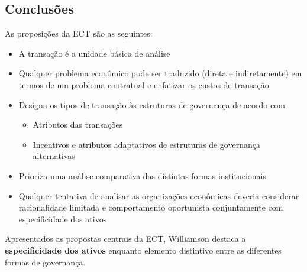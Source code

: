 \subsection*{Conclusões}

As proposições da ECT são as seguintes:
\begin{itemize}
	\item A transação é a unidade básica de análise
	\item Qualquer problema econômico pode ser traduzido (direta e indiretamente) em termos de um problema contratual e enfatizar os custos de transação
	\item Designa os tipos de transação às estruturas de governança de acordo com
	\begin{itemize}
		\item Atributos das transações
		\item Incentivos e atributos adaptativos de estruturas de governança alternativas
	\end{itemize}
	\item Prioriza uma análise comparativa das distintas formas institucionais
	\item Qualquer tentativa de analisar as organizações econômicas deveria considerar racionalidade limitada e comportamento oportunista conjuntamente com especificidade dos ativos
\end{itemize}
Apresentados as propostas centrais da ECT, Williamson destaca a \textbf{especificidade dos ativos} enquanto elemento distintivo entre as diferentes formas de governança.
